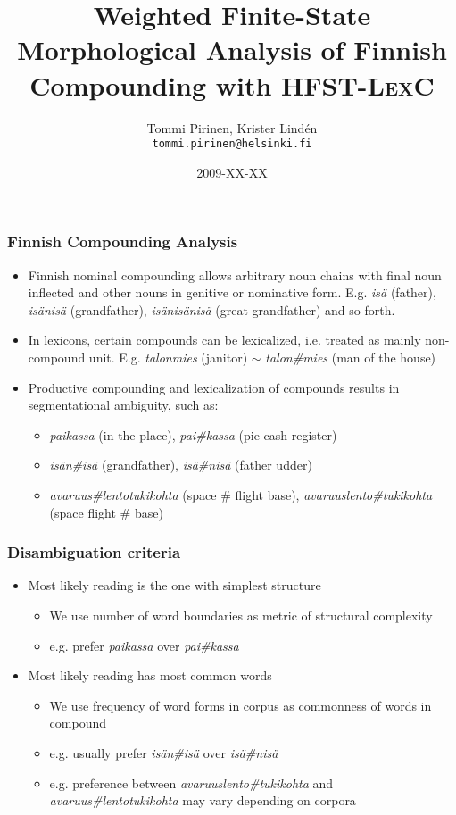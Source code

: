 \documentclass[utf8]{beamer}
\begin{document}
\title[Weighted Finnish Compounds with HFST-LexC]{Weighted Finite-State Morphological Analysis of Finnish Compounding with
\textsc{HFST-LexC}}
\author[Tommi Pirinen]{Tommi Pirinen, Krister Lindén\\ \texttt{tommi.pirinen@helsinki.fi}}
\date{2009-XX-XX}


\begin{frame}
\titlepage
\end{frame}

\begin{frame}
\frametitle{Finnish Compounding Analysis}
\begin{itemize}
\item Finnish nominal compounding allows arbitrary noun chains with final noun
inflected and other nouns in genitive or nominative form.
E.g. \emph{isä} (father), \emph{isänisä} (grandfather), \emph{isänisänisä}
(great grandfather) and so forth.
\item In lexicons, certain compounds can be lexicalized, i.e. treated as mainly non-compound unit. E.g. \emph{talonmies} (janitor) $\sim$
\emph{talon\#mies} (man of the house)
\item Productive compounding and lexicalization of compounds results in segmentational ambiguity, such as:
\begin{itemize}
\item \emph{paikassa} (in the place), \emph{pai\#kassa} (pie cash register)
\item \emph{isän\#isä} (grandfather), \emph{isä\#nisä} (father udder)
\item \emph{avaruus\#lentotukikohta} (space \# flight base), \emph{avaruuslento\#tukikohta} (space flight \# base)
\end{itemize}
\end{itemize}
\end{frame}

\begin{frame}
\frametitle{Disambiguation criteria}
\begin{itemize}
\item Most likely reading is the one with simplest structure
\begin{itemize}
\item We use number of word boundaries as metric of structural complexity
\item e.g. prefer \emph{paikassa} over \emph{pai\#kassa}
\end{itemize}
\item Most likely reading has most common words
\begin{itemize}
\item We use frequency of word forms in corpus as commonness of words in compound
\item e.g. usually prefer \emph{isän\#isä} over \emph{isä\#nisä}
\item e.g. preference between \emph{avaruuslento\#tukikohta} and 
\emph{avaruus\#lentotukikohta} may vary depending on corpora
\end{itemize}
\end{itemize}
\end{frame}
\end{document}
